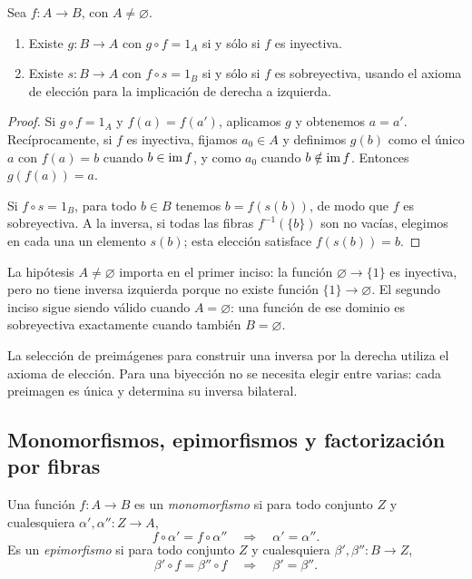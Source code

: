 \begin{prop}\label{prop:C1-inversas}
Sea $f:A\to B$, con $A\ne\varnothing$.
\begin{enumerate}[label=\alph*)]
\item Existe $g:B\to A$ con $g\circ f=1_A$ si y sólo si $f$ es inyectiva.
\item Existe $s:B\to A$ con $f\circ s=1_B$ si y sólo si $f$ es sobreyectiva, usando el axioma de elección para la implicación de derecha a izquierda.
\end{enumerate}
\end{prop}
\begin{proof}
Si $g\circ f=1_A$ y $f(a)=f(a')$, aplicamos $g$ y obtenemos $a=a'$. Recíprocamente, si $f$ es inyectiva, fijamos $a_0\in A$ y definimos $g(b)$ como el único $a$ con $f(a)=b$ cuando $b\in\operatorname{im} f$, y como $a_0$ cuando $b\notin\operatorname{im} f$. Entonces $g(f(a))=a$.

Si $f\circ s=1_B$, para todo $b\in B$ tenemos $b=f(s(b))$, de modo que $f$ es sobreyectiva. A la inversa, si todas las fibras $f^{-1}(\{b\})$ son no vacías, elegimos en cada una un elemento $s(b)$; esta elección satisface $f(s(b))=b$.
\end{proof}

\begin{obs}
La hipótesis $A\ne\varnothing$ importa en el primer inciso: la función $\varnothing\to\{1\}$ es inyectiva, pero no tiene inversa izquierda porque no existe función $\{1\}\to\varnothing$. El segundo inciso sigue siendo válido cuando $A=\varnothing$: una función de ese dominio es sobreyectiva exactamente cuando también $B=\varnothing$.
\end{obs}
\begin{obs}
La selección de preimágenes para construir una inversa por la derecha utiliza el axioma de elección. Para una biyección no se necesita elegir entre varias: cada preimagen es única y determina su inversa bilateral.
\end{obs}

\subsection{Monomorfismos, epimorfismos y factorización por fibras}\label{tema:1-2-3}\label{tema:1-2-4}
\begin{defi}
Una función $f:A\to B$ es un \emph{monomorfismo} si para todo conjunto $Z$ y cualesquiera $\alpha',\alpha'':Z\to A$,
\[
f\circ\alpha'=f\circ\alpha''\quad\Rightarrow\quad\alpha'=\alpha''.
\]
Es un \emph{epimorfismo} si para todo conjunto $Z$ y cualesquiera $\beta',\beta'':B\to Z$,
\[
\beta'\circ f=\beta''\circ f\quad\Rightarrow\quad\beta'=\beta''.
\]
\end{defi}

